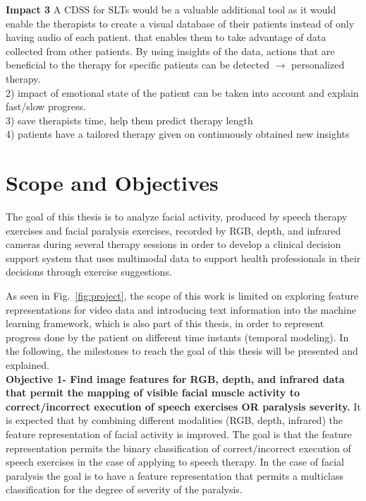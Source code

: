 \textbf{Impact 3} A CDSS for SLTs would be a valuable additional tool as it would enable the therapists to create a visual database of their patients instead of only having audio of each patient. that enables them to take advantage of data collected from other patients. By using insights of the data, actions that are beneficial to the therapy for specific patients can be detected $\rightarrow$ personalized therapy.\\
2) impact of emotional state of the patient can be taken into account and explain fast/slow progress.\\
3) save therapists time, help them predict therapy length\\
4) patients have a tailored therapy given on continuously obtained new insights


\section{Scope and Objectives}

The goal of this thesis is to analyze facial activity, produced by speech therapy exercises and facial paralysis exercises, recorded by RGB, depth, and infrared cameras during several therapy sessions in order to develop a clinical decision support system that uses multimodal data to support health professionals in their decisions through exercise suggestions.

As seen in Fig.~\ref{fig:project}, the scope of this work is limited on exploring feature representations for video data and introducing text information into the machine learning framework, which is also part of this thesis, in order to represent progress done by the patient on different time instants (temporal modeling). In the following, the milestones to reach the goal of this thesis will be presented and explained. \\

\textbf{Objective 1- Find image features for RGB, depth, and infrared data that permit the mapping of visible facial muscle activity to correct/incorrect execution of speech exercises OR paralysis severity.} It is expected that by combining different modalities (RGB, depth, infrared) the feature representation of facial activity is improved. The goal is that the feature representation permits the binary classification of correct/incorrect execution of speech exercises in the case of applying to speech therapy. In the case of facial paralysis the goal is to have a feature representation that permits a multiclass classification for the degree of severity of the paralysis.\\

